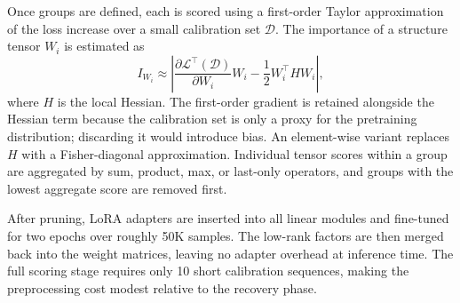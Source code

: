 Once groups are defined, each is scored using a first-order Taylor approximation of the loss increase over a small calibration set $\mathcal{D}$. The importance of a structure tensor $W_i$ is estimated as
\begin{equation}
	I_{W_i}
	\approx
	\left|
	\frac{\partial \mathcal{L}^{\top}(\mathcal{D})}{\partial W_i}W_i
	-\frac{1}{2}W_i^{\top}HW_i
	\right|,
	\label{eq:taylor-vector}
\end{equation}
where $H$ is the local Hessian. The first-order gradient is retained alongside the Hessian term because the calibration set is only a proxy for the pretraining distribution; discarding it would introduce bias. An element-wise variant replaces $H$ with a Fisher-diagonal approximation. Individual tensor scores within a group are aggregated by sum, product, max, or last-only operators, and groups with the lowest aggregate score are removed first.

After pruning, LoRA adapters \cite{hu2021lora} are inserted into all linear modules and fine-tuned for two epochs over roughly 50K samples. The low-rank factors are then merged back into the weight matrices, leaving no adapter overhead at inference time. The full scoring stage requires only 10 short calibration sequences, making the preprocessing cost modest relative to the recovery phase.

\methodsep

